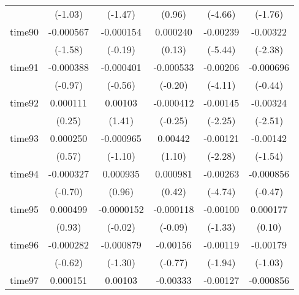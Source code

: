 \begin{table}[htbp]
\begin{tabular}{l*{5}{c}}
            &     (-1.03)         &     (-1.47)         &      (0.96)         &     (-4.66)         &     (-1.76)         \\
time90      &   -0.000567         &   -0.000154         &    0.000240         &    -0.00239\sym{***}&    -0.00322\sym{*}  \\
            &     (-1.58)         &     (-0.19)         &      (0.13)         &     (-5.44)         &     (-2.38)         \\
time91      &   -0.000388         &   -0.000401         &   -0.000533         &    -0.00206\sym{***}&   -0.000696         \\
            &     (-0.97)         &     (-0.56)         &     (-0.20)         &     (-4.11)         &     (-0.44)         \\
time92      &    0.000111         &     0.00103         &   -0.000412         &    -0.00145\sym{*}  &    -0.00324\sym{*}  \\
            &      (0.25)         &      (1.41)         &     (-0.25)         &     (-2.25)         &     (-2.51)         \\
time93      &    0.000250         &   -0.000965         &     0.00442         &    -0.00121\sym{*}  &    -0.00142         \\
            &      (0.57)         &     (-1.10)         &      (1.10)         &     (-2.28)         &     (-1.54)         \\
time94      &   -0.000327         &    0.000935         &    0.000981         &    -0.00263\sym{***}&   -0.000856         \\
            &     (-0.70)         &      (0.96)         &      (0.42)         &     (-4.74)         &     (-0.47)         \\
time95      &    0.000499         &  -0.0000152         &   -0.000118         &    -0.00100         &    0.000177         \\
            &      (0.93)         &     (-0.02)         &     (-0.09)         &     (-1.33)         &      (0.10)         \\
time96      &   -0.000282         &   -0.000879         &    -0.00156         &    -0.00119         &    -0.00179         \\
            &     (-0.62)         &     (-1.30)         &     (-0.77)         &     (-1.94)         &     (-1.03)         \\
time97      &    0.000151         &     0.00103         &    -0.00333         &    -0.00127\sym{*}  &   -0.000856         \\

\end{tabular}
\end{table}
